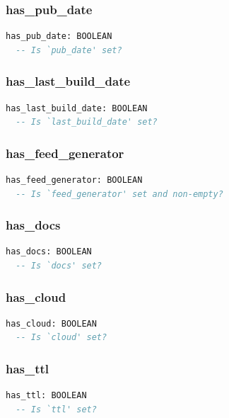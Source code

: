 \subsubsection{has\_pub\_date}

\begin{lstlisting}[language=Eiffel]
has_pub_date: BOOLEAN
  -- Is `pub_date' set?
\end{lstlisting}

\subsubsection{has\_last\_build\_date}

\begin{lstlisting}[language=Eiffel]
has_last_build_date: BOOLEAN
  -- Is `last_build_date' set?
\end{lstlisting}

\subsubsection{has\_feed\_generator}

\begin{lstlisting}[language=Eiffel]
has_feed_generator: BOOLEAN
  -- Is `feed_generator' set and non-empty?
\end{lstlisting}

\subsubsection{has\_docs}

\begin{lstlisting}[language=Eiffel]
has_docs: BOOLEAN
  -- Is `docs' set?
\end{lstlisting}

\subsubsection{has\_cloud}

\begin{lstlisting}[language=Eiffel]
has_cloud: BOOLEAN
  -- Is `cloud' set?
\end{lstlisting}

\subsubsection{has\_ttl}

\begin{lstlisting}[language=Eiffel]
has_ttl: BOOLEAN
  -- Is `ttl' set?
\end{lstlisting}

